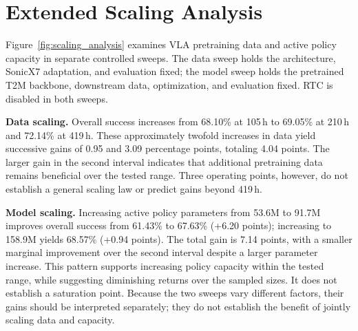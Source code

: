 \section{Extended Scaling Analysis}
\label{sec:scaling_analysis_appendix}

Figure~\ref{fig:scaling_analysis} examines VLA pretraining data and active policy capacity in separate controlled sweeps. The data sweep holds the architecture, SonicX7 adaptation, and evaluation fixed; the model sweep holds the pretrained T2M backbone, downstream data, optimization, and evaluation fixed. RTC is disabled in both sweeps.

\textbf{Data scaling.} Overall success increases from 68.10\% at 105\,h to 69.05\% at 210\,h and 72.14\% at 419\,h. These approximately twofold increases in data yield successive gains of 0.95 and 3.09 percentage points, totaling 4.04 points. The larger gain in the second interval indicates that additional pretraining data remains beneficial over the tested range. Three operating points, however, do not establish a general scaling law or predict gains beyond 419\,h.

\textbf{Model scaling.} Increasing active policy parameters from 53.6M to 91.7M improves overall success from 61.43\% to 67.63\% (+6.20 points); increasing to 158.9M yields 68.57\% (+0.94 points). The total gain is 7.14 points, with a smaller marginal improvement over the second interval despite a larger parameter increase. This pattern supports increasing policy capacity within the tested range, while suggesting diminishing returns over the sampled sizes. It does not establish a saturation point. Because the two sweeps vary different factors, their gains should be interpreted separately; they do not establish the benefit of jointly scaling data and capacity.
